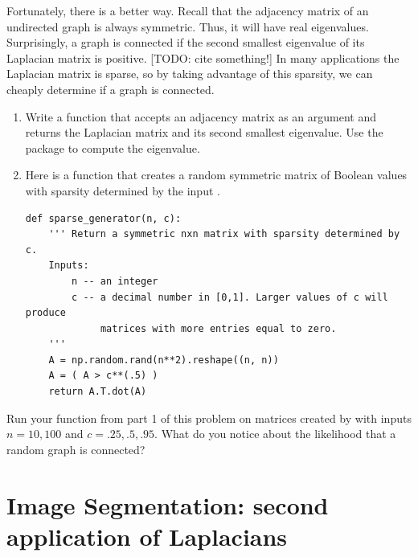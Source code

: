 Fortunately, there is a better way.
Recall that the adjacency matrix of an undirected graph is always symmetric. 
Thus, it will have real eigenvalues. 
Surprisingly, a graph is connected if the second smallest eigenvalue of its Laplacian matrix is positive. [TODO: cite something!]
In many applications the Laplacian matrix is sparse, so by taking advantage of this sparsity, we can cheaply determine if a graph is connected.

\begin{problem}
\leavevmode
\begin{enumerate}
\item Write a function that accepts an adjacency matrix as an argument and returns the Laplacian matrix and its second smallest eigenvalue.
Use the  package to compute the eigenvalue.

\item Here is a function that creates a random symmetric matrix of Boolean values with sparsity determined by the input .
\begin{lstlisting}
def sparse_generator(n, c):
    ''' Return a symmetric nxn matrix with sparsity determined by c.
    Inputs:
        n -- an integer
        c -- a decimal number in [0,1]. Larger values of c will produce
             matrices with more entries equal to zero.
    '''
    A = np.random.rand(n**2).reshape((n, n))
    A = ( A > c**(.5) )
    return A.T.dot(A)
\end{lstlisting}
\end{enumerate}

Run your function from part 1 of this problem on matrices created by  with inputs $n = 10, 100$ and $c = .25, .5, .95$. 
What do you notice about the likelihood that a random graph is connected?
\end{problem}


\section*{Image Segmentation: second application of Laplacians}

